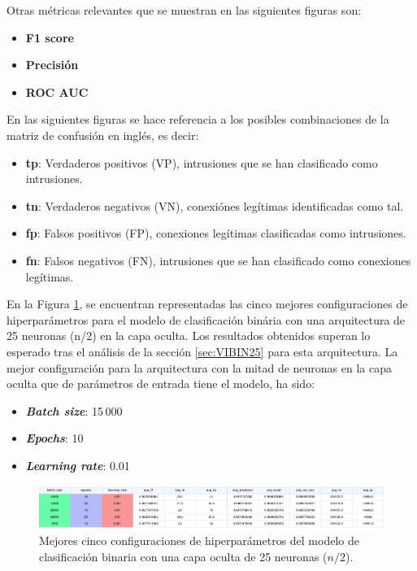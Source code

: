Otras métricas relevantes que se muestran en las siguientes figuras son:
\begin{itemize}
	\item \textbf{F1 score}%
	\item \textbf{Precisión}%
	\item \textbf{ROC AUC}%
\end{itemize}

En las siguientes figuras se hace referencia a los posibles combinaciones de la matriz de confusión en inglés, es decir:
\begin{itemize}
	\item \textbf{tp}: Verdaderos positivos (VP), intrusiones que se han clasificado como intrusiones.
	\item \textbf{tn}: Verdaderos negativos (VN), conexiónes legítimas identificadas como tal.
	\item \textbf{fp}: Falsos positivos (FP), conexiones legítimas clasificadas como intrusiones.
	\item \textbf{fn}: Falsos negativos (FN), intrusiones que se han clasificado como conexiones legítimas.
\end{itemize}

En la Figura \ref{fig:BINhs25}, se encuentran representadas las cinco mejores configuraciones de hiperparámetros para el modelo de clasificación binária con una arquitectura de 25 neuronas (n/2) en la capa oculta. Los resultados obtenidos superan lo esperado tras el análisis de la sección \ref{sec:VIBIN25} para esta arquitectura. La mejor configuración para la arquitectura con la mitad de neuronas en la capa oculta que de parámetros de entrada tiene el modelo, ha sido:
\begin{itemize}
	\item \textbf{\textit{Batch size}}: 15\,000
	\item \textbf{\textit{Epochs}}: 10
	\item \textbf{\textit{Learning rate}}: 0.01
\end{itemize}

\begin{figure}[H]
    \centering
    \includegraphics[width=1\textwidth]{./img/modelo/resultados/BINhs25.pdf}
    \caption{Mejores cinco configuraciones de hiperparámetros del modelo de clasificación binaria con una capa oculta de 25 neuronas ($n/2$).}
    \label{fig:BINhs25}
\end{figure}

